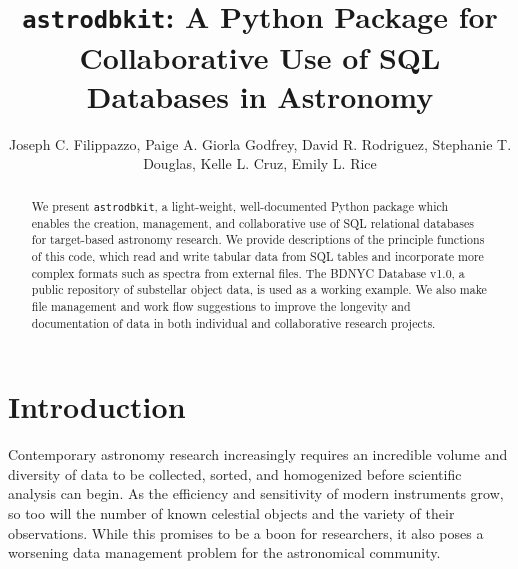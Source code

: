 \documentclass[iop,revtex4,natbib209]{emulateapj}
\begin{document}
\lstset{language=Python,upquote=true}

\title{\MakeLowercase{\texttt{astrodbkit}}: A Python Package for Collaborative Use of SQL Databases in Astronomy}

\author{Joseph C. Filippazzo, Paige A. Giorla Godfrey, David R. Rodriguez,
Stephanie T. Douglas,
Kelle L. Cruz,
Emily L. Rice}



\begin{abstract}
We present \texttt{astrodbkit}, a light-weight, well-documented Python package which enables the creation, management, and collaborative use of SQL relational databases for target-based astronomy research. We provide descriptions of the principle functions of this code, which read and write tabular data from SQL tables and incorporate more complex formats such as spectra from external files. The BDNYC Database v1.0, a public repository of substellar object data, is used as a working example. We also make file management and work flow suggestions to improve the longevity and documentation of data in both individual and collaborative research projects.
\end{abstract}


\maketitle
\section{Introduction}{\label{sec:intro}}
Contemporary astronomy research increasingly requires an incredible volume and diversity of data to be collected, sorted, and homogenized before scientific analysis can begin. As the efficiency and sensitivity of modern instruments grow, so too will the number of known celestial objects and the variety of their observations. While this promises to be a boon for researchers, it also poses a worsening data management problem for the astronomical community.  
\end{document}
